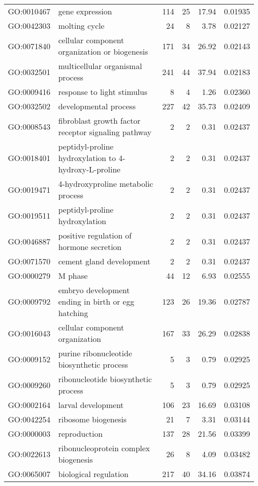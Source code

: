 \begin{longtable}{lp{4.5cm}rrrl}
  GO:0010467 & gene expression & 114 &  25 & 17.94 & 0.01935 \\ 
  GO:0042303 & molting cycle &  24 &   8 & 3.78 & 0.02127 \\ 
  GO:0071840 & cellular component organization or biogenesis & 171 &  34 & 26.92 & 0.02143 \\ 
  GO:0032501 & multicellular organismal process & 241 &  44 & 37.94 & 0.02183 \\ 
  GO:0009416 & response to light stimulus &   8 &   4 & 1.26 & 0.02360 \\ 
  GO:0032502 & developmental process & 227 &  42 & 35.73 & 0.02409 \\ 
  GO:0008543 & fibroblast growth factor receptor signaling pathway &   2 &   2 & 0.31 & 0.02437 \\ 
  GO:0018401 & peptidyl-proline hydroxylation to 4-hydroxy-L-proline &   2 &   2 & 0.31 & 0.02437 \\ 
  GO:0019471 & 4-hydroxyproline metabolic process &   2 &   2 & 0.31 & 0.02437 \\ 
  GO:0019511 & peptidyl-proline hydroxylation &   2 &   2 & 0.31 & 0.02437 \\ 
  GO:0046887 & positive regulation of hormone secretion &   2 &   2 & 0.31 & 0.02437 \\ 
  GO:0071570 & cement gland development &   2 &   2 & 0.31 & 0.02437 \\ 
  GO:0000279 & M phase &  44 &  12 & 6.93 & 0.02555 \\ 
  GO:0009792 & embryo development ending in birth or egg hatching & 123 &  26 & 19.36 & 0.02787 \\ 
  GO:0016043 & cellular component organization & 167 &  33 & 26.29 & 0.02838 \\ 
  GO:0009152 & purine ribonucleotide biosynthetic process &   5 &   3 & 0.79 & 0.02925 \\ 
  GO:0009260 & ribonucleotide biosynthetic process &   5 &   3 & 0.79 & 0.02925 \\ 
  GO:0002164 & larval development & 106 &  23 & 16.69 & 0.03108 \\ 
  GO:0042254 & ribosome biogenesis &  21 &   7 & 3.31 & 0.03144 \\ 
  GO:0000003 & reproduction & 137 &  28 & 21.56 & 0.03399 \\ 
  GO:0022613 & ribonucleoprotein complex biogenesis &  26 &   8 & 4.09 & 0.03482 \\ 
  GO:0065007 & biological regulation & 217 &  40 & 34.16 & 0.03874 \\ 

\end{longtable}
